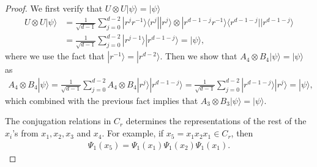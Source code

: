 \documentclass[11pt,letterpaper]{article}
\newcommand{\ket}[1]{|#1\rangle}
\newcommand{\ketbra}[2]{|#1\rangle\langle#2|}
\newcommand{\x}{\otimes}
\newcommand{\1}{\mathbb{1}}
\theoremstyle{definition}
\begin{document}
\begin{proof}
We first verify that $U \x U \ket{\psi} = \ket{\psi}$
\begin{align}
	U \x U \ket{\psi} &= \frac{1}{\sqrt{d-1}}\sum_{j = 0}^{d-2} \ketbra{ r^{j}r^{-1}}{r^j} \ket{r^j} \x \ketbra{r^{d-1-j} r^{-1}}{r^{d-1-j}} \ket{r^{d-1-j}} \\
	&=\frac{1}{\sqrt{d-1}} \sum_{j=0}^{d-2} \ket{r^{j-1}}\ket{r^{d-1-j}} = \ket{\psi},
\end{align}
where we use the fact that $\ket{r^{-1}} = \ket{r^{d-2}}$.
Then we show that $A_4 \x B_4 \ket{\psi} = \ket{\psi}$ as 
\begin{align}
	A_4 \x B_4 \ket{\psi} = \frac{1}{\sqrt{d-1}}  \sum_{j=0}^{d-2} A_4 \x B_4 \ket{r^j} \ket{r^{d-1-j}} 
	= \frac{1}{\sqrt{d-1}} \sum_{j=0}^{d-2} \ket{r^{d-1-j}} \ket{r^{j}} =\ket{\psi},
\end{align}
which combined with the previous fact implies that $A_3 \x B_3 \ket{\psi} = \ket{\psi}$.

The conjugation relations in $C_r$ determines the representations of 
the rest of the $x_i$'s from $x_1,x_2,x_3$ and $x_4$. 
For example, if $x_5 = x_1x_2x_1 \in C_r$, then
\begin{align}
	\Psi_1(x_5) = \Psi_1(x_1)\Psi_1(x_2) \Psi_1(x_1).
\end{align}


\end{proof}
\end{document}
